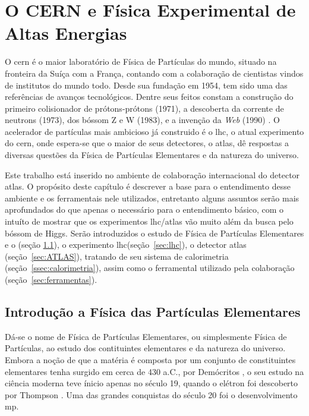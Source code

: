 \chapter{O CERN e Física Experimental de Altas Energias}
\glsresetall


O \gls{cern} é o maior
laboratório de Física de Partículas do mundo, situado na fronteira da Suíça com
a França, contando com a colaboração de cientistas vindos de institutos
do mundo todo. Desde sua fundação em 1954, tem sido uma das referências de
avanços tecnológicos. Dentre seus feitos constam a construção do primeiro 
colisionador de prótons-prótons (1971), a descoberta 
da corrente de neutrons (1973), dos bóssom Z e W (1983), 
e a invenção da \emph{Web} (1990) \cite{webCERN}. O acelerador de partículas mais ambicioso 
\cite{Intro_Standard,Beiser} já construido é o \gls{lhc}, o atual experimento do
\gls{cern}, onde espera-se que o maior de seus 
detectores, o \gls{atlas}, dê respostas a diversas questões da Física de Partículas
Elementares e da natureza do universo.

Este trabalho está inserido no ambiente de colaboração internacional do detector
\gls{atlas}. O propósito deste capítulo é descrever a base para o entendimento desse ambiente
e os ferramentais nele utilizados, entretanto alguns assuntos serão mais
aprofundados do que apenas o necessário para o entendimento básico, com o
intuíto de mostrar que os experimentos \gls{lhc}/\gls{atlas} vão muito além 
da busca pelo bóssom de Higgs. Serão introduzidos o estudo de Física de Partículas
Elementares e o  (seção \ref{sec:fis_part}), 
o experimento \gls{lhc}(seção~\ref{sec:lhc}), o detector
\gls{atlas} (seção~\ref{sec:ATLAS}), tratando de seu sistema de calorimetria
(seção~\ref{ssec:calorimetria}), assim como o ferramental utilizado pela colaboração
(seção~\ref{sec:ferramentas}). 

\section{Introdução a Física das Partículas Elementares}
\label{sec:fis_part}

Dá-se o nome de Física de Partículas Elementares, ou simplesmente Física de
Partículas, ao estudo dos contituintes
elementares e da natureza do universo. Embora a noção de que a matéria é
composta por um conjunto de constituintes elementares tenha surgido em cerca de
430 a.C., por Demócritos \cite{democritos}, o seu estudo na ciência moderna teve ínicio apenas 
no século 19, quando o elétron foi descoberto por Thompson \cite{thompson}.
Uma das grandes conquistas do século 20 foi o desenvolvimento \gls{mp}.  

